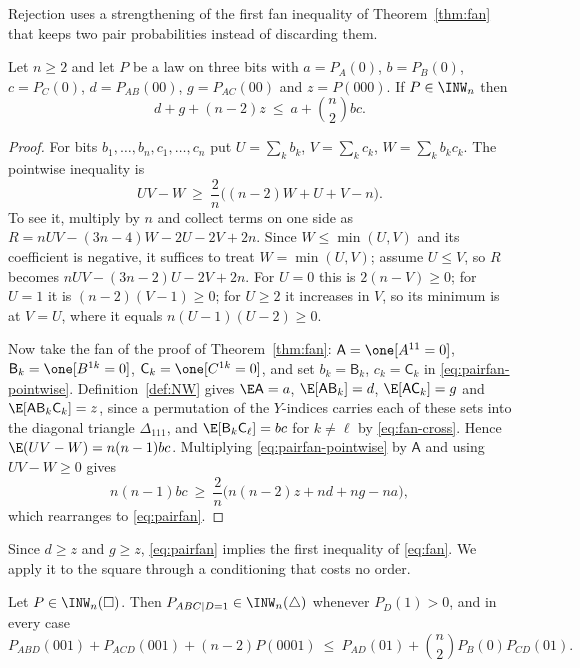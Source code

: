 Rejection uses a strengthening of the first fan inequality of Theorem~\ref{thm:fan} that keeps two pair probabilities instead of discarding them.

\begin{proposition}\label{prop:pairfan}
Let $n\ge2$ and let $P$ be a law on three bits with $a=P_A(0)$, $b=P_B(0)$, $c=P_C(0)$, $d=P_{AB}(00)$, $g=P_{AC}(00)$ and $z=P(000)$. If $P\in\INW_n$ then
\begin{equation}\label{eq:pairfan}
d+g+(n-2)z\ \le\ a+\binom n2bc .
\end{equation}
\end{proposition}

\begin{proof}
For bits $b_1,\dots,b_n,c_1,\dots,c_n$ put $U=\sum_kb_k$, $V=\sum_kc_k$, $W=\sum_kb_kc_k$. The pointwise inequality is
\begin{equation}\label{eq:pairfan-pointwise}
UV-W\ \ge\ \frac2n\bigl((n-2)W+U+V-n\bigr).
\end{equation}
To see it, multiply by $n$ and collect terms on one side as $R=nUV-(3n-4)W-2U-2V+2n$. Since $W\le\min(U,V)$ and its coefficient is negative, it suffices to treat $W=\min(U,V)$; assume $U\le V$, so $R$ becomes $nUV-(3n-2)U-2V+2n$. For $U=0$ this is $2(n-V)\ge0$; for $U=1$ it is $(n-2)(V-1)\ge0$; for $U\ge2$ it increases in $V$, so its minimum is at $V=U$, where it equals $n(U-1)(U-2)\ge0$.

Now take the fan of the proof of Theorem~\ref{thm:fan}: $\mathsf A=\one[A^{11}=0]$, $\mathsf B_k=\one[B^{1k}=0]$, $\mathsf C_k=\one[C^{1k}=0]$, and set $b_k=\mathsf B_k$, $c_k=\mathsf C_k$ in \eqref{eq:pairfan-pointwise}. Definition~\ref{def:NW} gives $\E\mathsf A=a$, $\E[\mathsf A\mathsf B_k]=d$, $\E[\mathsf A\mathsf C_k]=g$ and $\E[\mathsf A\mathsf B_k\mathsf C_k]=z$, since a permutation of the $Y$-indices carries each of these sets into the diagonal triangle $\Delta_{111}$, and $\E[\mathsf B_k\mathsf C_\ell]=bc$ for $k\ne\ell$ by \eqref{eq:fan-cross}. Hence $\E(UV-W)=n(n-1)bc$. Multiplying \eqref{eq:pairfan-pointwise} by $\mathsf A$ and using $UV-W\ge0$ gives
\[
n(n-1)bc\ \ge\ \frac2n\bigl(n(n-2)z+nd+ng-na\bigr),
\]
which rearranges to \eqref{eq:pairfan}.
\end{proof}

Since $d\ge z$ and $g\ge z$, \eqref{eq:pairfan} implies the first inequality of \eqref{eq:fan}. We apply it to the square through a conditioning that costs no order.

\begin{lemma}\label{lem:sqtri}
Let $P\in\INW_n(\square)$. Then $P_{ABC\mid D=1}\in\INW_n(\triangle)$ whenever $P_D(1)>0$, and in every case
\begin{equation}\label{eq:sqtri}
P_{ABD}(001)+P_{ACD}(001)+(n-2)P(0001)\ \le\ P_{AD}(01)+\binom n2P_B(0)P_{CD}(01).
\end{equation}
\end{lemma}

